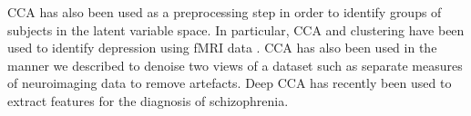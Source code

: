 CCA has also been used as a preprocessing step in order to identify groups of subjects in the latent variable space.
In particular, CCA and clustering have been used to identify depression using fMRI data\cite{dinga2019evaluating} \cite{drysdale2017resting}.
CCA has also been used in the manner we described to denoise two views of a dataset such as separate measures of neuroimaging data \cite{zhuang2020technical} to remove artefacts.
Deep CCA has recently been used to extract features for the diagnosis of schizophrenia\cite{qi2016deep}.





